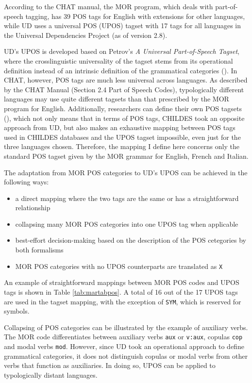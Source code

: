 According to the CHAT manual, the MOR program, which deals with part-of-speech tagging, has 39 POS tags for English with extensions for other languages, while UD uses a universal POS (UPOS) tagset with 17 tags for all languages in the Universal Dependencies Project (as of version 2.8).

UD's UPOS is developed based on Petrov's \emph{A Universal Part-of-Speech Tagset}, where the crosslinguistic universality of the tagset stems from its operational definition instead of an intrinsic definition of the grammatical categories (\cite{petrov2012}). In CHAT, however, POS tags are much less universal across languages. As described by the CHAT Manual (Section 2.4 Part of Speech Codes), typologically different languages may use quite different tagsets than that prescribed by the MOR program for English. Additionally, researchers can define their own POS tagsets (\cite{Macwhinney2000}), which not only means that in terms of POS tags, CHILDES took an opposite approach from UD, but also makes an exhaustive mapping between POS tags used in CHILDES databases and the UPOS tagset impossible, even just for the three languages chosen. Therefore, the mapping I define here concerns only the standard POS tagset given by the MOR grammar for English, French and Italian.

The adaptation from MOR POS categories to UD's UPOS can be achieved in the following ways:
\begin{itemize}
	\item a direct mapping where the two tags are the same or has a straightforward relationship
	\item collapsing many MOR POS categories into one UPOS tag when applicable
	\item best-effort decision-making based on the description of the POS cetegories by both formalisms
	\item MOR POS categories with no UPOS counterparts are translated as \texttt{X}
\end{itemize}

An example of straightforward mappings between MOR POS codes and UPOS tags is shown in Table \ref{tab:martabpos}. A total of 16 out of the 17 UPOS tags are used in the tagset mapping, with the exception of \texttt{SYM}, which is reserved for symbols.

Collapsing of POS categories can be illustrated by the example of auxiliary verbs. The MOR code differentiates between auxiliary verbs \texttt{aux} or \texttt{v:aux}, copulas \texttt{cop} and modal verbs \texttt{mod}. However, since UD took an operational approach to define grammatical categories, it does not distinguish copulas or modal verbs from other verbs that function as auxiliaries.  In doing so, UPOS can be applied to typologically distant languages.

